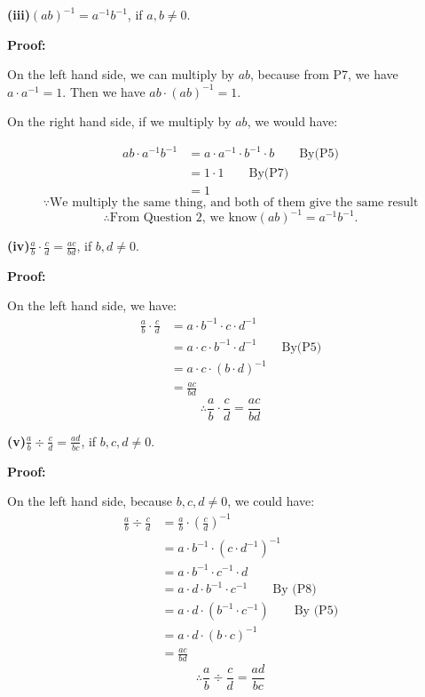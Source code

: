 \documentclass[a4paper,12pt]{report}
\begin{document}
\noindent
\textbf{(iii)}$(ab)^{-1}=a^{-1}b^{-1}$, if $a,b\neq 0$.

\noindent
\textbf{Proof:}

\noindent
On the left hand side, we can multiply by $ab$, because from P7, we have $a\cdot{a^{-1}=1}$.  Then we have $ab\cdot{(ab)^{-1}}=1$.

\noindent
On the right hand side, if we multiply by $ab$, we would have:

\begin{align*}
 ab\cdot{a^{-1}b^{-1}} & = a\cdot{a^{-1}}\cdot{b^{-1}}\cdot{b} \qquad \text{By(P5)} \\
 			   & = 1\cdot{1} \qquad \text{By(P7)}\\
 			   & = 1
\end{align*}
\[\because \text{We multiply the same thing, and both of them give the same result}\]
\[\therefore \text{From Question 2, we know} (ab)^{-1}=a^{-1}b^{-1}. \]

\noindent
\textbf{(iv)}$\frac{a}{b} \cdot{ \frac{c}{d}}=\frac{ac}{bd}$, if $b,d\neq 0$.

\noindent
\textbf{Proof:}

\noindent
On the left hand side, we have:
\begin{align*}
 \frac{a}{b} \cdot{ \frac{c}{d}} & = a\cdot{b^{-1}}\cdot {c}\cdot{d^{-1}} \\
 			   & = a\cdot {c}\cdot{b^{-1}}\cdot{d^{-1}} \qquad \text{By(P5)}\\
 			   & = a\cdot {c}\cdot({b}\cdot{d})^{-1}\\
 			   & = \frac{ac}{bd}
\end{align*}
\[\therefore \frac{a}{b} \cdot{ \frac{c}{d}}=\frac{ac}{bd} \]


\noindent
\textbf{(v)}$\frac{a}{b}\div\frac{c}{d}=\frac{ad}{bc}$, if $b,c,d\neq 0$.

\noindent
\textbf{Proof:}

\noindent
On the left hand side, because $b,c,d\neq 0$, we could have:
\begin{align*}
 \frac{a}{b}\div\frac{c}{d} & =\frac{a}{b} \cdot{(\frac{c}{d})^{-1}} \\
 			   & = a\cdot{b^{-1}}\cdot({c}\cdot{d^{-1}})^{-1} \\
 			   & = a\cdot{b^{-1}}\cdot{c}^{-1}\cdot{d}\\
 			   & = a\cdot{d}\cdot{b^{-1}}\cdot{c}^{-1} \qquad \text{By (P8)}\\
 			   & = a\cdot{d}\cdot({b^{-1}}\cdot{c}^{-1}) \qquad \text{By (P5)}\\
 			   & = a\cdot{d}\cdot({b}\cdot{c})^{-1} \\
 			   & = \frac{ac}{bd}
\end{align*}
\[\therefore \frac{a}{b}\div\frac{c}{d}=\frac{ad}{bc} \]
\end{document}
